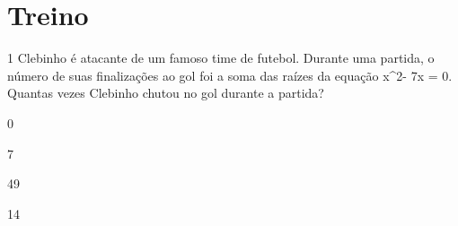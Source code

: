\section{Treino}

\num{1} Clebinho é atacante de um famoso time de futebol. Durante uma
partida, o número de suas finalizações ao gol foi a soma das raízes da
equação x^2- 7x = 0. Quantas vezes Clebinho chutou no gol durante a
partida?
\item 0
\item 7
\item 49
\item 14






















